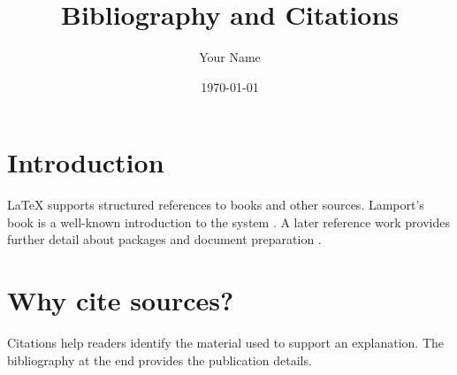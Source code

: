 \documentclass[11pt,a4paper]{article}
\title{Bibliography and Citations}
\author{Your Name}
\date{\today}
\begin{document}
\maketitle

\section{Introduction}
LaTeX supports structured references to books and other sources. Lamport's book is a well-known introduction to the system \citep{lamport1994}. A later reference work provides further detail about packages and document preparation \citep{mittelbach2004}.

\section{Why cite sources?}
Citations help readers identify the material used to support an explanation. The bibliography at the end provides the publication details.



\end{document}
